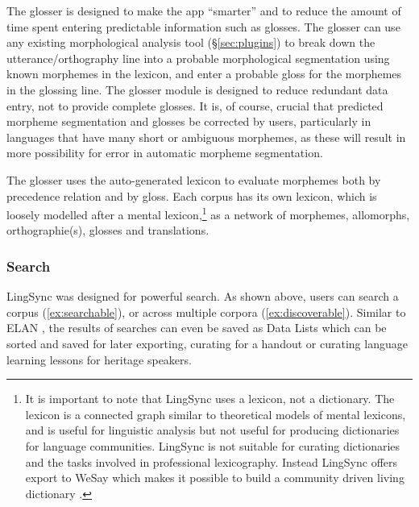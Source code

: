 \documentclass[letterpaper, 12pt, dvips]{mitwpl}
\begin{document}
The glosser is designed to make the app ``smarter'' and to reduce the amount of time spent entering predictable information such as glosses.
The glosser can use any existing morphological analysis tool (\S \ref{sec:plugins}) to break down the utterance/orthography line  into a probable morphological segmentation using known morphemes in the lexicon,
and enter a probable gloss for the morphemes in the glossing line.
The glosser module is designed to reduce redundant data entry,
not to provide complete glosses.
It is, of course, crucial that predicted morpheme segmentation and glosses be corrected by users,
particularly in languages that have many short or ambiguous morphemes,
as these will result in more possibility for error in automatic morpheme segmentation.
 

The glosser uses the auto-generated lexicon to evaluate morphemes both by precedence relation and by gloss.
Each corpus has its own lexicon,
which is loosely modelled after a mental lexicon,\footnote{It is important to note that LingSync uses a lexicon, not a dictionary. The lexicon is a connected graph similar to theoretical models of mental lexicons, and is useful for linguistic analysis but not useful for producing dictionaries for language communities. LingSync is not suitable for curating dictionaries and the tasks involved in professional lexicography. Instead LingSync offers export to WeSay which makes it possible to build a community driven living dictionary \citep{WeSay:2007:Online}.} 
as a network of morphemes,
allomorphs,
orthographie(s),
glosses and translations.


\subsubsection{Search}

LingSync was designed for powerful search.
As shown above, users can search a corpus (\ref{ex:searchable}),
or across multiple corpora (\ref{ex:discoverable}).
Similar to ELAN \citep{Wittenburg:2006}, 
the results of  searches can even be saved as Data Lists which can be sorted and
saved for later exporting, curating for a handout or curating language learning lessons for heritage speakers.
\end{document}

